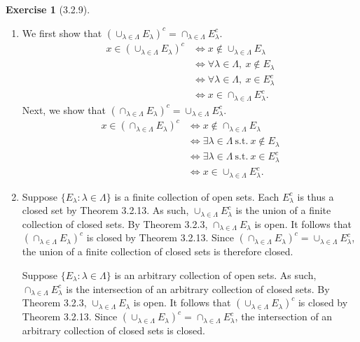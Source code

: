 \documentclass{amsart}
\theoremstyle{definition}
\newtheorem{exercise}{Exercise}
\newcommand{\st}{\mathrel{:}}
\begin{document}
\begin{exercise}[3.2.9]
  \begin{enumerate}[label={(\alph*)}]
    \item We first show that ${(\cup_{\lambda \in \Lambda} E_\lambda)}^c =
      \cap_{\lambda \in \Lambda} E_\lambda^c$.
      \begin{align*}
        x \in {(\cup_{\lambda \in \Lambda} E_\lambda)}^c &\iff x \notin
        \cup_{\lambda \in \Lambda} E_\lambda \\
        &\iff \forall \lambda \in \Lambda,\ x \notin E_\lambda \\
        &\iff \forall \lambda \in \Lambda,\ x \in E_\lambda^c \\
        &\iff x \in \cap_{\lambda \in \Lambda} E_\lambda^c.
      \end{align*}
      Next, we show that ${(\cap_{\lambda \in \Lambda} E_\lambda)}^c =
      \cup_{\lambda \in \Lambda} E_\lambda^c$.
      \begin{align*}
        x \in {(\cap_{\lambda \in \Lambda} E_\lambda)}^c &\iff x \notin
        \cap_{\lambda \in \Lambda} E_\lambda \\
        &\iff \exists \lambda \in \Lambda\ \text{s.t.}\ x \notin E_\lambda \\
        &\iff \exists \lambda \in \Lambda\ \text{s.t.}\ x \in E_\lambda^c \\
        &\iff x \in \cup_{\lambda \in \Lambda} E_\lambda^c.
      \end{align*}
    \item Suppose $\{E_\lambda \st \lambda \in \Lambda\}$ is a finite collection
      of open sets. Each $E_\lambda^c$ is thus a closed set by Theorem 3.2.13.
      As such, $\cup_{\lambda \in \Lambda} E_\lambda^c$ is the union of a finite
      collection of closed sets. By Theorem 3.2.3, $\cap_{\lambda \in \Lambda}
      E_\lambda$ is open. It follows that ${(\cap_{\lambda \in \Lambda}
      E_\lambda)}^c$ is closed by Theorem 3.2.13. Since ${(\cap_{\lambda \in
      \Lambda} E_\lambda)}^c= \cup_{\lambda \in \Lambda} E_\lambda^c$, the union
      of a finite collection of closed sets is therefore closed.

      Suppose $\{E_\lambda \st \lambda \in \Lambda\}$ is an arbitrary
      collection of open sets. As such, $\cap_{\lambda \in \Lambda} E_\lambda^c$
      is the intersection of an arbitrary collection of closed sets. By Theorem
      3.2.3, $\cup_{\lambda \in \Lambda} E_\lambda$ is open. It follows that
      ${(\cup_{\lambda \in \Lambda} E_\lambda)}^c$ is closed by Theorem 3.2.13.
      Since ${(\cup_{\lambda \in \Lambda} E_\lambda)}^c = \cap_{\lambda \in
      \Lambda} E_\lambda^c$, the intersection of an arbitrary collection of
      closed sets is closed.
  \end{enumerate}
\end{exercise}
\end{document}
